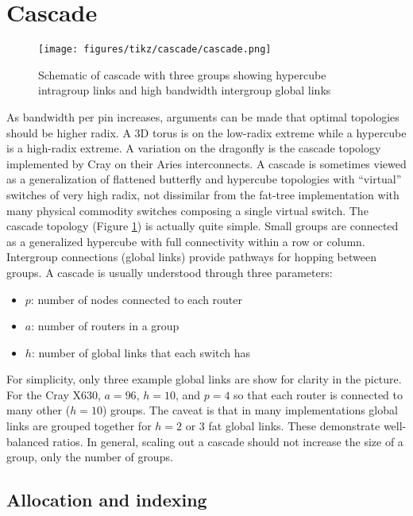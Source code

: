 
\section{Cascade}
\label{sec:tutorial:cascade}

\begin{figure}[h!]
\centering
\texttt{[image: figures/tikz/cascade/cascade.png]}
\caption{Schematic of cascade with three groups showing hypercube intragroup links and high bandwidth intergroup global links}
\label{fig:topologies:cascade}
\end{figure}

As bandwidth per pin increases, arguments can be made that optimal topologies should be higher radix.
A 3D torus is on the low-radix extreme while a hypercube is a high-radix extreme.
A variation on the dragonfly is the cascade topology implemented by Cray on their Aries interconnects.
A cascade is sometimes viewed as a generalization of flattened butterfly and hypercube topologies with ``virtual'' switches of very high radix,
not dissimilar from the fat-tree implementation with many physical commodity switches composing a single virtual switch.
The cascade topology (Figure \ref{fig:topologies:cascade}) is actually quite simple.
Small groups are connected as a generalized hypercube with full connectivity within a row or column.
Intergroup connections (global links) provide pathways for hopping between groups.
A cascade is usually understood through three parameters:
\begin{itemize}
\item $p$: number of nodes connected to each router
\item $a$: number of routers in a group
\item $h$: number of global links that each switch has
\end{itemize}

For simplicity, only three example global links are show for clarity in the picture.
For the Cray X630, $a = 96$, $h=10$, and $p=4$ so that each router is connected to many other ($h=10$) groups.
The caveat is that in many implementations global links are grouped together for $h=2$ or $3$ fat global links.
These demonstrate well-balanced ratios.
In general, scaling out a cascade should not increase the size of a group, only the number of groups.

\subsection{Allocation and indexing}
\label{subsec:cascade:allocatoin}

